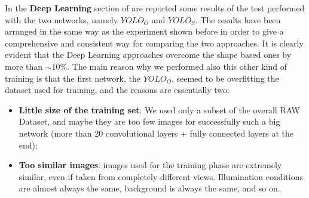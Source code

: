 %

In the \textbf{Deep Learning} section of  are reported some results of the test performed with the two networks, namely $YOLO_O$ and $YOLO_S$. The results have been arranged in the same way as the experiment shown before in order to give a comprehensive and consistent way for comparing the two approaches. It is clearly evident that the Deep Learning approaches overcome the shape based ones by more than $\sim10\%$. The main reason why we performed also this other kind of training is that the first network, the $YOLO_O$, seemed to be overfitting the dataset used for training, and the reasons are essentially two:

\begin{itemize}
	\item \textbf{Little size of the training set}: We used only a subset of the overall RAW Dataset, and maybe they are too few images for successfully such a big network (more than 20 convolutional layers + fully connected layers at the end);
	\item \textbf{Too similar images}: images used for the training phase are extremely similar, even if taken from completely different views. Illumination conditions are almost always the same, background is always the same, and so on.
\end{itemize}

